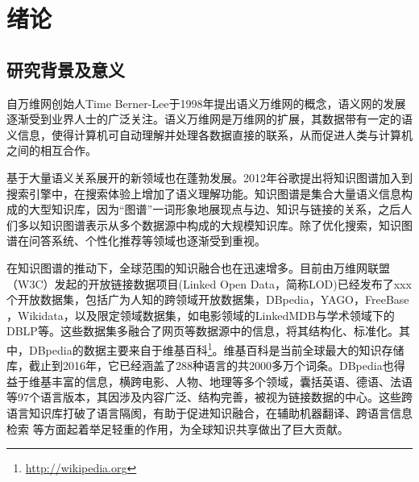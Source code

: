 \chapter{绪论}
\label{cha:intro}

\section{研究背景及意义}

自万维网创始人Time Berner-Lee于1998年提出语义万维网的概念\cite{berners1998semantic}，语义网的发展逐渐受到业界人士的广泛关注。语义万维网是万维网的扩展，其数据带有一定的语义信息，使得计算机可自动理解并处理各数据直接的联系，从而促进人类与计算机之间的相互合作。

基于大量语义关系展开的新领域也在蓬勃发展。2012年谷歌提出将知识图谱\cite{singhal2012introducing}加入到搜索引擎中，在搜索体验上增加了语义理解功能。知识图谱是集合大量语义信息构成的大型知识库，因为“图谱”一词形象地展现点与边、知识与链接的关系，之后人们多以知识图谱表示从多个数据源中构成的大规模知识库。除了优化搜索，知识图谱在问答系统\cite{yih2015semantic,yang2014joint}、个性化推荐\cite{kaminskas2012knowledge}等领域也逐渐受到重视。

在知识图谱的推动下，全球范围的知识融合也在迅速增多。目前由万维网联盟（W3C）发起的开放链接数据项目(Linked Open Data，简称LOD)已经发布了xxx个开放数据集，包括广为人知的跨领域开放数据集，DBpedia\cite{auer2007dbpedia,bizer2009dbpedia,lehmann2015dbpedia}，YAGO\cite{suchanek2007yago,suchanek2008yago,hoffart2013yago2,mahdisoltani2014yago3}，FreeBase \cite{bollacker2008freebase}，Wikidata\cite{vrandevcic2014wikidata,erxleben2014introducing}，以及限定领域数据集，如电影领域的LinkedMDB\cite{hassanzadeh2009linked}与学术领域下的DBLP等。这些数据集多融合了网页等数据源中的信息，将其结构化、标准化。其中，DBpedia的数据主要来自于维基百科\footnote{\url{http://wikipedia.org}}。维基百科是当前全球最大的知识存储库，截止到2016年，它已经涵盖了288种语言的共2000多万个词条。DBpedia也得益于维基丰富的信息，横跨电影、人物、地理等多个领域，囊括英语、德语、法语等97个语言版本，其因涉及内容广泛、结构完善，被视为链接数据的中心。这些跨语言知识库打破了语言隔阂，有助于促进知识融合，在辅助机器翻译\cite{niehues2011using}、跨语言信息检索\cite{giang2015building} 等方面起着举足轻重的作用，为全球知识共享做出了巨大贡献。

